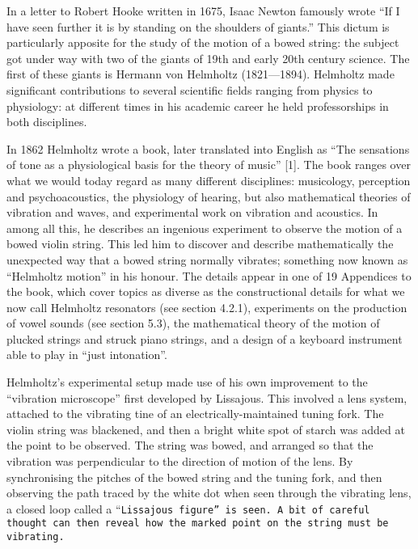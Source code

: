   In a letter to Robert Hooke written in 1675, Isaac Newton famously wrote ``If 
  I have seen further it is by standing on the shoulders of giants.'' This 
  dictum is particularly apposite for the study of the motion of a bowed 
  string: the subject got under way with two of the giants of 19th and early 
  20th century science. The first of these giants is Hermann von Helmholtz 
  (1821—1894). Helmholtz made significant contributions to several scientific 
  fields ranging from physics to physiology: at different times in his academic 
  career he held professorships in both disciplines. 


  In 1862 Helmholtz wrote a book, later translated into English as “The 
  sensations of tone as a physiological basis for the theory of music” [1]. The 
  book ranges over what we would today regard as many different disciplines: 
  musicology, perception and psychoacoustics, the physiology of hearing, but 
  also mathematical theories of vibration and waves, and experimental work on 
  vibration and acoustics. In among all this, he describes an ingenious 
  experiment to observe the motion of a bowed violin string. This led him to 
  discover and describe mathematically the unexpected way that a bowed string 
  normally vibrates; something now known as “Helmholtz motion” in his honour. 
  The details appear in one of 19 Appendices to the book, which cover topics as 
  diverse as the constructional details for what we now call Helmholtz 
  resonators (see section 4.2.1), experiments on the production of vowel sounds 
  (see section 5.3), the mathematical theory of the motion of plucked strings 
  and struck piano strings, and a design of a keyboard instrument able to play 
  in “just intonation”. 

  Helmholtz’s experimental setup made use of his own improvement to the 
  “vibration microscope” first developed by Lissajous. This involved a lens 
  system, attached to the vibrating tine of an electrically-maintained tuning 
  fork. The violin string was blackened, and then a bright white spot of starch 
  was added at the point to be observed. The string was bowed, and arranged so 
  that the vibration was perpendicular to the direction of motion of the lens. 
  By synchronising the pitches of the bowed string and the tuning fork, and 
  then observing the path traced by the white dot when seen through the 
  vibrating lens, a closed loop called a “\tt{}Lissajous figure\rm{}” is seen. 
  A bit of careful thought can then reveal how the marked point on the string 
  must be vibrating. 

